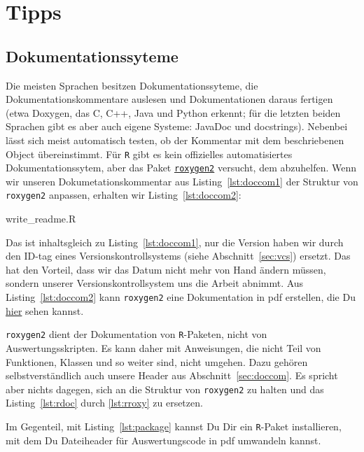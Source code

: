 \documentclass[twoside]{scrartcl}
\providecommand{\R}{\texttt{R}}
\providecommand{\code}[1]{\texttt{#1}}
\begin{document}
\section{Tipps\label{sec:tipps}}
\subsection{Dokumentationssyteme}
Die meisten Sprachen besitzen Dokumentationssyteme, die Dokumentationskommentare
auslesen und Dokumentationen daraus fertigen (etwa Doxygen, das C, C++, Java und
Python erkennt; f\"u{}r die letzten beiden Sprachen gibt es aber auch eigene
Systeme: JavaDoc und docstrings). 
Nebenbei l\"a{}sst sich meist automatisch testen, ob der
Kommentar mit dem beschriebenen Object \"u{}bereinstimmt. 
F\"u{}r \R{} gibt es kein offizielles automatisiertes Dokumentationssytem, aber 
das Paket \href{http://cran.r-project.org/web/packages/roxygen2/index.html}
{\code{roxygen2}} versucht, dem abzuhelfen. 
Wenn wir unseren Dokumetationskommentar aus Listing~\ref{lst:doccom1} der 
Struktur von \code{roxygen2} anpassen, erhalten wir Listing~\ref{lst:doccom2}:

%
{write_readme.R}

Das ist inhaltsgleich zu  Listing~\ref{lst:doccom1}, nur die Version haben wir 
durch den ID-tag eines Versionskontrollsystems (siehe Abschnitt~\ref{sec:vcs}) 
ersetzt. Das hat den Vorteil, dass wir das Datum nicht mehr von Hand
\"a{}ndern m\"u{}ssen, sondern unserer Versionskontrollsystem uns die Arbeit
abnimmt.
Aus Listing~\ref{lst:doccom2}  kann \code{roxygen2} eine Dokumentation in pdf 
erstellen, die Du \href{write_readme.pdf}{hier} sehen kannst.

\code{roxygen2} dient der Dokumentation von \R{}-Paketen, nicht von
Auswertungsskripten. Es kann daher mit Anweisungen, die nicht Teil von
Funktionen, Klassen und so weiter sind, nicht umgehen. Dazu geh\"oren
selbstverst\"a{}ndlich auch unsere Header aus Abschnitt~\ref{sec:doccom}.
Es spricht aber nichts dagegen, sich an die Struktur von \code{roxygen2} zu
halten und das Listing~\ref{lst:rdoc} durch \ref{lst:rroxy} zu ersetzen.



\newif\ifrpack
\rpacktrue
\ifrpack
Im Gegenteil, mit Listing~\ref{lst:package} kannst Du Dir ein \R{}-Paket
installieren, mit dem Du Dateiheader f\"u{}r Auswertungscode in pdf umwandeln
kannst. 

\end{document}
